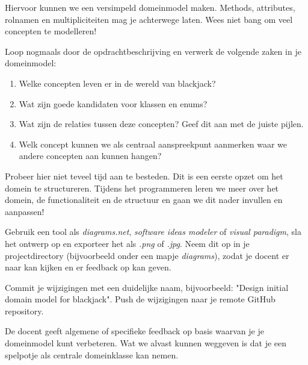 Hiervoor kunnen we een versimpeld domeinmodel maken. 
Methods, attributes, rolnamen en multipliciteiten mag je achterwege laten.
Wees niet bang om veel concepten te modelleren!

Loop nogmaals door de opdrachtbeschrijving en verwerk de volgende zaken in je 
domeinmodel:
\begin{enumerate}
    \item Welke concepten leven er in de wereld van blackjack? 
    \item Wat zijn goede kandidaten voor klassen en enums?
    \item Wat zijn de relaties tussen deze concepten? Geef dit aan met de juiste pijlen.
    \item Welk concept kunnen we als centraal aanspreekpunt aanmerken waar we andere concepten aan kunnen hangen?
\end{enumerate}

Probeer hier niet teveel tijd aan te besteden.
Dit is een eerste opzet om het domein te structureren.
Tijdens het programmeren leren we meer over het domein, de functionaliteit en de structuur
en gaan we dit nader invullen en aanpassen!

Gebruik een tool als \textit{diagrams.net}, \textit{software ideas modeler} of \textit{visual paradigm},
sla het ontwerp op en exporteer het als \textit{.png} of \textit{.jpg}. 
Neem dit op in je projectdirectory (bijvoorbeeld onder een mapje \textit{diagrams}),
zodat je docent er naar kan kijken en er feedback op kan geven.

Commit je wijzigingen met een duidelijke naam, 
bijvoorbeeld: "Design initial domain model for blackjack". 
Push de wijzigingen naar je remote GitHub repository.

De docent geeft algemene of specifieke feedback
op basis waarvan je je domeinmodel kunt verbeteren.
Wat we alvast kunnen weggeven is dat je een spelpotje 
als centrale domeinklasse kan nemen.
